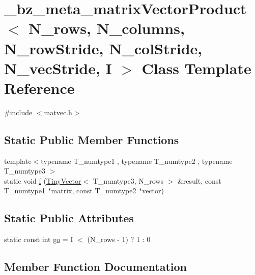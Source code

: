 \hypertarget{class__bz__meta__matrixVectorProduct}{}\section{\+\_\+bz\+\_\+meta\+\_\+matrix\+Vector\+Product$<$ N\+\_\+rows, N\+\_\+columns, N\+\_\+row\+Stride, N\+\_\+col\+Stride, N\+\_\+vec\+Stride, I $>$ Class Template Reference}
\label{class__bz__meta__matrixVectorProduct}


{\ttfamily \#include $<$matvec.\+h$>$}

\subsection*{Static Public Member Functions}
\begin{DoxyCompactItemize}
\item 
{\footnotesize template$<$typename T\+\_\+numtype1 , typename T\+\_\+numtype2 , typename T\+\_\+numtype3 $>$ }\\static void \hyperlink{class__bz__meta__matrixVectorProduct_a0a980bc5774254ad7d294c15b3cfc157}{f} (\hyperlink{classTinyVector}{Tiny\+Vector}$<$ T\+\_\+numtype3, N\+\_\+rows $>$ \&result, const T\+\_\+numtype1 $\ast$matrix, const T\+\_\+numtype2 $\ast$vector)
\end{DoxyCompactItemize}
\subsection*{Static Public Attributes}
\begin{DoxyCompactItemize}
\item 
static const int \hyperlink{class__bz__meta__matrixVectorProduct_a23362c5b3ec788738af91b7d62dc069a}{go} = I $<$ (N\+\_\+rows -\/ 1) ? 1 \+: 0
\end{DoxyCompactItemize}


\subsection{Member Function Documentation}
\hypertarget{class__bz__meta__matrixVectorProduct_a0a980bc5774254ad7d294c15b3cfc157}{}
